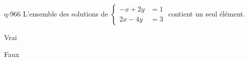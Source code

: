 \begin{truefalse}{q-966}
L'ensemble des solutions de $\begin{cases} -x+2y &= 1 \\ 2x-4y &= 3 \end{cases}$ contient un seul élément.
\item Vrai
\item* Faux
\end{truefalse}

